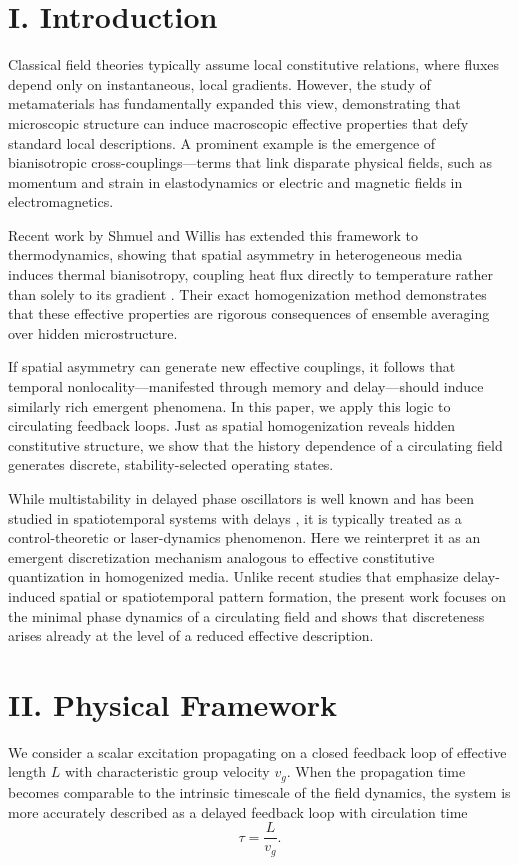 \documentclass[11pt,a4paper]{article}
\begin{document}
\section*{I. Introduction}
Classical field theories typically assume local constitutive relations, where fluxes depend only on instantaneous, local gradients. However, the study of metamaterials has fundamentally expanded this view, demonstrating that microscopic structure can induce macroscopic effective properties that defy standard local descriptions. A prominent example is the emergence of bianisotropic cross-couplings—terms that link disparate physical fields, such as momentum and strain in elastodynamics or electric and magnetic fields in electromagnetics.

Recent work by Shmuel and Willis has extended this framework to thermodynamics, showing that spatial asymmetry in heterogeneous media induces thermal bianisotropy, coupling heat flux directly to temperature rather than solely to its gradient \cite{Willis2012}. Their exact homogenization method demonstrates that these effective properties are rigorous consequences of ensemble averaging over hidden microstructure.

If spatial asymmetry can generate new effective couplings, it follows that temporal nonlocality—manifested through memory and delay—should induce similarly rich emergent phenomena. In this paper, we apply this logic to circulating feedback loops. Just as spatial homogenization reveals hidden constitutive structure, we show that the history dependence of a circulating field generates discrete, stability-selected operating states.

While multistability in delayed phase oscillators is well known and has been studied in spatiotemporal systems with delays \cite{Yanchuk2017}, it is typically treated as a control-theoretic or laser-dynamics phenomenon. Here we reinterpret it as an emergent discretization mechanism analogous to effective constitutive quantization in homogenized media. Unlike recent studies that emphasize delay-induced spatial or spatiotemporal pattern formation, the present work focuses on the minimal phase dynamics of a circulating field and shows that discreteness arises already at the level of a reduced effective description.

\section*{II. Physical Framework}
We consider a scalar excitation propagating on a closed feedback loop of effective length $L$ with characteristic group velocity $v_g$. When the propagation time becomes comparable to the intrinsic timescale of the field dynamics, the system is more accurately described as a delayed feedback loop with circulation time
\begin{equation}
\tau = \frac{L}{v_g}.
\end{equation}
\end{document}

